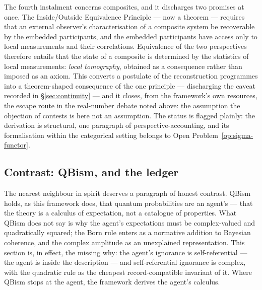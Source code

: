 The fourth instalment concerns composites, and it discharges two promises at once. The
Inside/Outside Equivalence Principle --- now a theorem --- requires that an external observer's
characterisation of a composite system be recoverable by the embedded participants, and the
embedded participants have access only to local measurements and their correlations. Equivalence
of the two perspectives therefore entails that the state of a composite is determined by the
statistics of local measurements: \emph{local tomography}, obtained as a consequence rather than
imposed as an axiom. This converts a postulate of the reconstruction programmes
\autocite{Hardy2001a,mullerp2011} into a theorem-shaped consequence of the one principle ---
discharging the caveat recorded in \S\ref{sec:continuity} --- and it closes, from the framework's
own resources, the escape route in the real-number debate noted above: the assumption the
objection of \autocite{hoffreumonwoods2026real} contests is here not an assumption. The status is
flagged plainly: the derivation is structural, one paragraph of perspective-accounting, and its
formalisation within the categorical setting belongs to Open Problem~\ref{op:sigma-functor}.

\subsection{Contrast: QBism, and the ledger}

The nearest neighbour in spirit deserves a paragraph of honest contrast. QBism
\autocite{fuchsschack2013qbism} holds, as this framework does, that quantum probabilities are an
agent's --- that the theory is a calculus of expectation, not a catalogue of properties. What QBism
does not say is why the agent's expectations must be complex-valued and quadratically squared; the
Born rule enters as a normative addition to Bayesian coherence, and the complex amplitude as an
unexplained representation. This section is, in effect, the missing why: the agent's ignorance is
self-referential --- the agent is inside the description --- and self-referential ignorance is
complex, with the quadratic rule as the cheapest record-compatible invariant of it. Where QBism
stops at the agent, the framework derives the agent's calculus.

